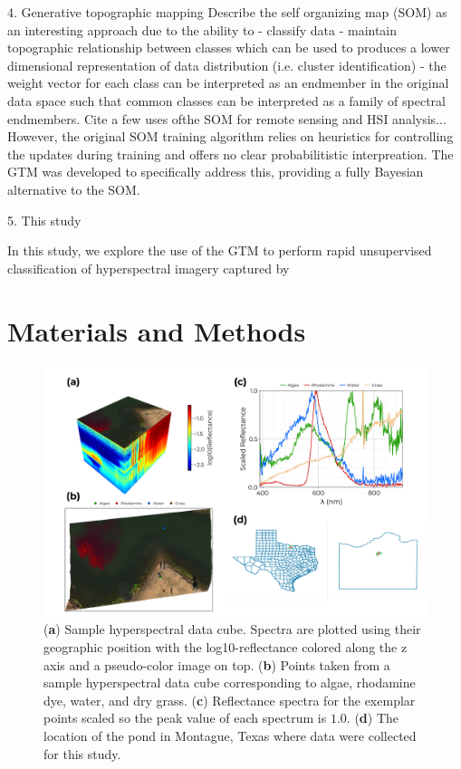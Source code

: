 \documentclass[remotesensing,article,submit,pdftex,moreauthors]{Definitions/mdpi}
\begin{document}
4. Generative topographic mapping 
Describe the self organizing map (SOM) as an interesting approach due to the ability to 
    - classify data 
    - maintain topographic relationship between classes which can be used to produces a lower dimensional representation of data distribution (i.e. cluster identification)
    - the weight vector for each class can be interpreted as an endmember in the original data space such that common classes can be interpreted as a family of spectral endmembers.
Cite a few uses ofthe SOM for remote sensing and HSI analysis...
However, the original SOM training algorithm relies on heuristics for controlling the updates during training and offers no clear probabilitistic interpreation. The GTM was developed to specifically address this, providing a fully Bayesian alternative to the SOM.

5. This study

In this study, we explore the use of the GTM to perform rapid unsupervised classification of hyperspectral imagery captured by 



\section{Materials and Methods}


\begin{figure}[t]
\centering
\includegraphics[width=\columnwidth]{paper/figures/methods/sample-spectra.pdf}
\caption{(\textbf{a}) Sample hyperspectral data cube. Spectra are plotted using their geographic position with the log10-reflectance colored along the z axis and a pseudo-color image on top. (\textbf{b}) Points taken from a sample hyperspectral data cube corresponding to algae, rhodamine dye, water, and dry grass. (\textbf{c}) Reflectance spectra for the exemplar points scaled so the peak value of each spectrum is $1.0$. (\textbf{d}) The location of the pond in Montague, Texas where data were collected for this study.\label{fig:sample-spectra}}
\end{figure}  
\end{document}
